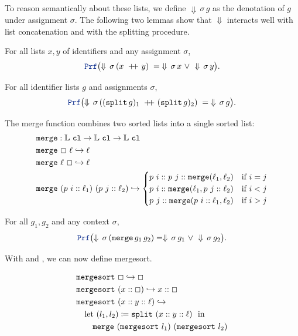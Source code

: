 To reason semantically about these lists, we define $\Downarrow\,\sigma\,g$ as the denotation of $g$ under assignment $\sigma$.  
The following two lemmas show that $\Downarrow$ interacts well with list concatenation and with the splitting procedure.


\begin{lemma}\label{lem:den-cat}
For all lists \(x,y\) of identifiers and any assignment \(\sigma\),
\[
\prf\bigl(\Downarrow\,\sigma\,(x \concat y) \;=\; \Downarrow\,\sigma\,x \ \vee\ \Downarrow\,\sigma\,y\bigr).
\]
\end{lemma}

\begin{lemma}\label{lem:split-correct}
For all identifier lists \(g\) and assignments \(\sigma\),
\[
  \prf\bigl(\Downarrow\,\sigma\,((\kw{split}\,g)_1 \concat (\kw{split}\,g)_2) \;=\; \Downarrow\,\sigma\,g\bigr).
\]
\end{lemma}

\begin{definition}[merge]
The merge function combines two sorted lists into a single sorted list:
\begin{align*}
& \texttt{\upshape{merge}}: \mathbb{L}~\texttt{\upshape{cl}} \rightarrow \mathbb{L}~\texttt{\upshape{cl}} \rightarrow \mathbb{L}~\texttt{\upshape{cl}} \\
&\texttt{\upshape{merge}}~\Box~\ell \hookrightarrow \ell \\
&\texttt{\upshape{merge}}~\ell~\Box \hookrightarrow \ell \\
&\texttt{\upshape{merge}}~(p~i :: \ell_1)~(p~j::\ell_2) \hookrightarrow
\begin{cases}
p~i :: p~j :: \texttt{\upshape{merge}}(\ell_1,\ell_2) & \text{if } i = j \\
p~i :: \texttt{\upshape{merge}}(\ell_1, p~j::\ell_2) & \text{if } i < j \\
p~j :: \texttt{\upshape{merge}}(p~i::\ell_1, \ell_2) & \text{if } i > j
\end{cases}
\end{align*}
\end{definition}

\begin{lemma}\label{lem:merge-correct}
For all \(g_1,g_2\) and any context \(\sigma\),
\[
\prf\bigl(\Downarrow\,\sigma\,(\kw{merge}\,g_1\,g_2) = \Downarrow\,\sigma\,g_1 \ \vee\ \Downarrow\,\sigma\,g_2 \bigr).
\]
\end{lemma}

With  and , we can now define mergesort.


\begin{definition}[mergesort]
\begin{align*}
&\texttt{\upshape{mergesort}}~\Box \hookrightarrow \Box \\
&\texttt{\upshape{mergesort}}~(x :: \Box) \hookrightarrow x :: \Box \\
&\texttt{\upshape{mergesort}}~(x :: y :: \ell) \hookrightarrow \\
  & \quad \text{let } (l_1,l_2) \coloneqq \texttt{\upshape{split}}~(x :: y :: \ell)\ \text{ in }\ \\
  & \qquad \texttt{\upshape{merge}}~(\texttt{\upshape{mergesort}}~l_1)~(\texttt{\upshape{mergesort}}~l_2)
\end{align*}
\end{definition}

